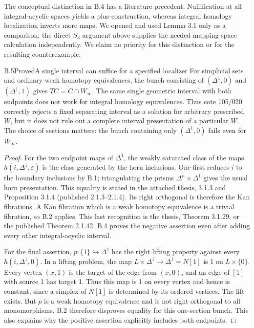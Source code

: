 The conceptual distinction in B.4 has a literature precedent.  Nullification
at all integral-acyclic spaces yields a plus-construction, whereas integral
homology localization inverts more maps.  We opened
\citet[Lemma 3.1, Theorems 3.3 and 4.3]{BerrickCasacuberta1999} and used
Lemma 3.1 only as a comparison; the direct $S_3$ argument above supplies the
needed mapping-space calculation independently.  We claim no priority for
this distinction or for the resulting counterexample.

\begin{claim}{B.5}{Proved}{A single interval can suffice for a specified localizer}\label{B5}
For simplicial sets and ordinary weak homotopy equivalences, the bunch
consisting of $(\Delta^1,0)$ and $(\Delta^1,1)$ gives
$TC=C\cap W_\infty$.  The same single geometric interval with both endpoints
does not work for integral homology equivalences.  Thus cote 105/020 correctly
rejects a fixed separating interval as a solution for arbitrary prescribed
$W$, but it does not rule out a complete interval presentation of a
particular $W$.  The choice of sections matters: the bunch containing only
$(\Delta^1,0)$ fails even for $W_\infty$.
\end{claim}
\begin{proof}
For the two endpoint maps of $\Delta^1$, the weakly saturated class of the
maps $h(i,\Delta^1,\varepsilon)$ is the class generated by the horn
inclusions.  One first reduces $i$ to the boundary inclusions by B.1;
triangulating the prisms $\Delta^n\times\Delta^1$ gives the usual horn
presentation.  This equality is stated in the attached thesis, 3.1.3 and
Proposition 3.1.4 (published 2.1.3--2.1.4).  Its right orthogonal is therefore
the Kan fibrations.  A Kan fibration which is a weak homotopy equivalence
is a trivial fibration, so B.2 applies.  This last recognition is the thesis,
Theorem 3.1.29, or the published Theorem 2.1.42.  B.4 proves the negative
assertion even after adding every other integral-acyclic interval.

For the final assertion, $p:\{1\}\hookrightarrow\Delta^1$ has the right
lifting property against every $h(i,\Delta^1,0)$.  In a lifting problem,
the map $L\times\Delta^1\to\Delta^1=N[1]$ is 1 on
$L\times\{0\}$.  Every vertex $(x,1)$ is the target of the edge from
$(x,0)$, and an edge of $[1]$ with source 1 has target 1.  Thus this map
is 1 on every vertex and hence is constant, since a simplex of $N[1]$
is determined by its ordered vertices.  The lift exists.  But $p$ is a
weak homotopy equivalence and is not right orthogonal to all
monomorphisms.  B.2 therefore disproves equality for this one-section
bunch.  This also explains why the positive assertion explicitly
includes both endpoints.
\end{proof}

